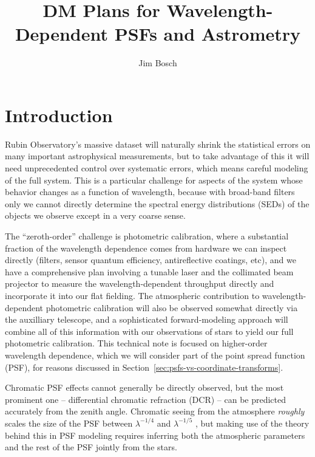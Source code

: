 \documentclass[DM,authoryear,toc]{lsstdoc}
\title{DM Plans for Wavelength-Dependent PSFs and Astrometry}
\author{%
Jim Bosch
}
\date{\vcsDate}
\begin{document}
\maketitle

\section{Introduction}

Rubin Observatory's massive dataset will naturally shrink the statistical errors on many important astrophysical measurements, but to take advantage of this it will need unprecedented control over systematic errors, which means careful modeling of the full system.
This is a particular challenge for aspects of the system whose behavior changes as a function of wavelength, because with broad-band filters only we cannot directly determine the spectral energy distributions (SEDs) of the objects we observe except in a very coarse sense.

The ``zeroth-order'' challenge is photometric calibration, where a substantial fraction of the wavelength dependence comes from hardware we can inspect directly (filters, sensor quantum efficiency, antireflective coatings, etc), and we have a comprehensive plan involving a tunable laser and the collimated beam projector to measure the wavelength-dependent throughput directly and incorporate it into our flat fielding.
The atmospheric contribution to wavelength-dependent photometric calibration will also be observed somewhat directly via the auxilliary telescope, and a sophisticated forward-modeling approach will combine all of this information with our observations of stars to yield our full photometric calibration.
This technical note is focused on higher-order wavelength dependence, which we will consider part of the point spread function (PSF), for reasons discussed in Section~\ref{sec:psfs-vs-coordinate-transforms}.

Chromatic PSF effects cannot generally be directly observed, but the most prominent one -- differential chromatic refraction (DCR) -- can be predicted accurately from the zenith angle.
Chromatic seeing from the atmosphere \emph{roughly} scales the size of the PSF between $\lambda^{-1/4}$ and $\lambda^{-1/5}$ \citep{1966JOSA...56.1372F,2015ApJ...807..182M}, but making use of the theory behind this in PSF modeling requires inferring both the atmospheric parameters and the rest of the PSF jointly from the stars.
\end{document}
